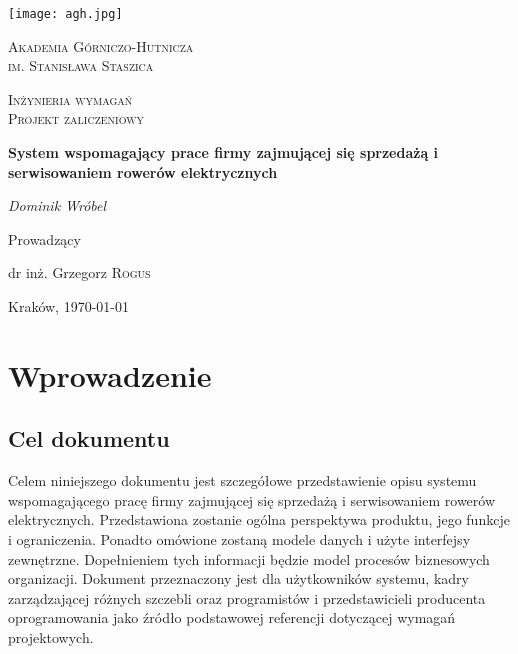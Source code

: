 \documentclass[a4paper,20pt]{article}
\begin{document}
\begin{titlepage}
	\centering
	\texttt{[image: agh.jpg]}\par\vspace{1cm}
	{\scshape\LARGE Akademia Górniczo-Hutnicza \\ im. Stanisława Staszica \par}
	\vspace{1cm}
	{\scshape\Large  Inżynieria wymagań \\ Projekt zaliczeniowy \par}
	\vspace{1.5cm}
	{\huge\bfseries System wspomagający prace firmy zajmującej się sprzedażą i serwisowaniem rowerów elektrycznych \par}
	\vspace{2cm}
	{\Large\itshape  Dominik Wróbel\par}
	\vfill
	Prowadzący\par
	dr inż. Grzegorz \textsc{Rogus}

	\vfill

	{\large Kraków, \today \par}
\end{titlepage}

\pagestyle{firstpage}
\tableofcontents



\newpage
\pagestyle{normalpage}

\section{Wprowadzenie}





\subsection{Cel dokumentu}
Celem niniejszego dokumentu jest szczegółowe przedstawienie opisu systemu wspomagającego pracę firmy zajmującej się sprzedażą i serwisowaniem rowerów elektrycznych. Przedstawiona zostanie ogólna perspektywa produktu, jego funkcje i ograniczenia. Ponadto omówione zostaną modele danych i użyte interfejsy zewnętrzne. Dopełnieniem tych informacji będzie model procesów biznesowych organizacji. Dokument przeznaczony jest dla użytkowników systemu, kadry zarządzającej różnych szczebli oraz programistów i przedstawicieli producenta oprogramowania jako źródło podstawowej referencji dotyczącej wymagań projektowych.
\end{document}
